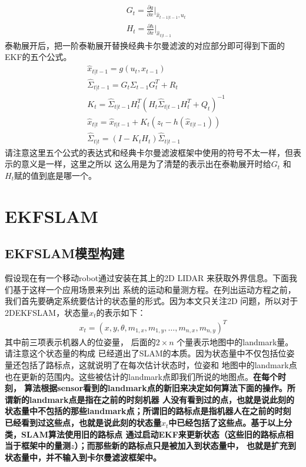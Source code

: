\documentclass[UTF8,a4paper,10pt]{ctexart}
\begin{document}
\begin{align}
&G_t=\frac{\partial{g}}{\partial{x}}|_{\hat{x}_{t-1|t-1},u_t}\\
&H_t=\frac{\partial{h}}{\partial{x}}|_{\hat{x}_{t|t-1}}
\end{align}
泰勒展开后，把一阶泰勒展开替换经典卡尔曼滤波的对应部分即可得到下面的EKF的五个公式。
\begin{align}
& \hat{x}_{t|t-1}=g(u_t,x_{t-1})\\
\label{ekf}
& \hat{\Sigma}_{t|t-1}=G_t\Sigma_{t-1}G_t^T+R_t\\
& K_t=\hat{\Sigma}_{t|t-1}H_t^T(H_t\hat{\Sigma}_{t|t-1}H_t^T+Q_t)^{-1}\\
& \hat{x}_{t|t}=\hat{x}_{t|t-1}+K_t(z_t-h(\hat x_{t|{t-1}}))\\
& \hat{\Sigma}_{t|t}=(I-K_tH_t)\hat{\Sigma}_{t|t-1}
\end{align}
请注意这里五个公式的表达式和经典卡尔曼滤波框架中使用的符号不太一样，但表示的意义是一样，这里之所以
这么用是为了清楚的表示出在泰勒展开时给$G_t$ 和 $H_t$赋的值到底是哪一个。

\section{EKFSLAM}
\subsection{EKFSLAM模型构建}
\label{moxing}
假设现在有一个移动robot通过安装在其上的2D LIDAR 来获取外界信息。下面我们基于这样一个应用场景来列出
系统的运动和量测方程。在列出运动方程之前，我们首先要确定系统要估计的状态量的形式。因为本文只关注2D
问题，所以对于2DEKFSLAM，状态量$x_t$的表示如下：
\begin{align}
x_t=(x,y,\theta, m_{1,x}, m_{1,y},\dots, m_{n,x}, m_{n,y})^T
\end{align}
其中前三项表示机器人的位姿量， 后面的$2 \times n$ 个量表示地图中的landmark量。请注意这个状态量的构成
已经道出了SLAM的本质。因为状态量中不仅包括位姿量还包括了路标点，这就说明了在每次估计状态时，位姿和
地图中的landmark点也在更新的范围内。这些被估计的landmark点即我们所说的地图点。{\bfseries 在每个时刻，
算法根据sensor看到的landmark点的新旧来决定如何算法下面的操作。所谓新的landmark点是指在之前的时刻机器
人没有看到过的点，也就是说此刻的状态量中不包括的那些landmark点；所谓旧的路标点是指机器人在之前的时刻
已经看到过这些点，也就是说此刻的状态量$x_t$中已经包括了这些点。基于以上分类，SLAM算法使用旧的路标点
通过启动EKF来更新状态（这些旧的路标点相当于框架中的量测$z$）；而那些新的路标点只是被加入到状态量中，
也就是扩充到状态量中，并不输入到卡尔曼滤波框架中。} 
\end{document}
